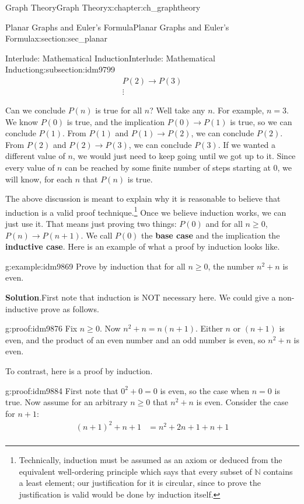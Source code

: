 \documentclass[oneside,10pt,]{book}
\newcommand{\terminology}[1]{\textbf{#1}}
\numberwithin{equation}{chapter}
\def\N{\mathbb N}
\def\imp{\rightarrow}
\newcommand{\amp}{&}
\begin{document}
\begin{chapterptx}{Graph Theory}{}{Graph Theory}{}{}{x:chapter:ch_graphtheory}
\begin{sectionptx}{Planar Graphs and Euler's Formula}{}{Planar Graphs and Euler's Formula}{}{}{x:section:sec_planar}
\begin{subsectionptx}{Interlude: Mathematical Induction}{}{Interlude: Mathematical Induction}{}{}{g:subsection:idm9799}
\begin{gather*}
P(2) \imp P(3)\\
\vdots
\end{gather*}
%
\par
Can we conclude \(P(n)\) is true for all \(n\)?  Well take any \(n\).  For example, \(n = 3\).  We know \(P(0)\) is true, and the implication \(P(0) \imp P(1)\) is true, so we can conclude \(P(1)\).  From \(P(1)\) and \(P(1) \imp P(2)\), we can conclude \(P(2)\).  From \(P(2)\) and \(P(2) \imp P(3)\), we can conclude \(P(3)\).  If we wanted a different value of \(n\), we would just need to keep going until we got up to it.  Since every value of \(n\) can be reached by some finite number of steps starting at 0, we will know, for each \(n\) that \(P(n)\) is true.%
\par
The above discussion is meant to explain why it is reasonable to believe that induction is a valid proof technique.\footnote{Technically, induction must be assumed as an axiom or deduced from the equivalent well-ordering principle which says that every subset of \(\N\) contains a least element; our justification for it is circular, since to prove the justification is valid would be done by induction itself.\label{g:fn:idm9861}}  Once we believe induction works, we can just use it.  That means just proving two things: \(P(0)\) and for all \(n \ge 0\), \(P(n) \imp P(n+1)\).  We call \(P(0)\) the \terminology{base case} and the implication the \terminology{inductive case}.  Here is an example of what a proof by induction looks like.%
\begin{example}{}{g:example:idm9869}%
Prove by induction that for all \(n \ge 0\), the number \(n^2 + n\) is even.%
\par\smallskip%
\noindent\textbf{Solution}.\hypertarget{g:solution:idm9874}{}\quad{}First note that induction is NOT necessary here.  We could give a non-inductive prove as follows.%
\begin{proofptx}{}{g:proof:idm9876}
Fix \(n \ge 0\).  Now \(n^2 + n = n(n+1)\).  Either \(n\) or \((n+1)\) is even, and the product of an even number and an odd number is even, so \(n^2 + n\) is even.%
\end{proofptx}
To contrast, here is a proof by induction.%
\begin{proofptx}{}{g:proof:idm9884}
First note that \(0^2 + 0 = 0\) is even, so the case when \(n = 0\) is true.  Now assume for an arbitrary \(n\ge 0\) that \(n^2 + n\) is even.  Consider the case for \(n+1\):%
\begin{align*}
(n+1)^2 + n+1 \amp = n^2 + 2n + 1 + n + 1\\

\end{align*}
\end{proofptx}
\end{example}
\end{subsectionptx}
\end{sectionptx}
\end{chapterptx}
\end{document}
